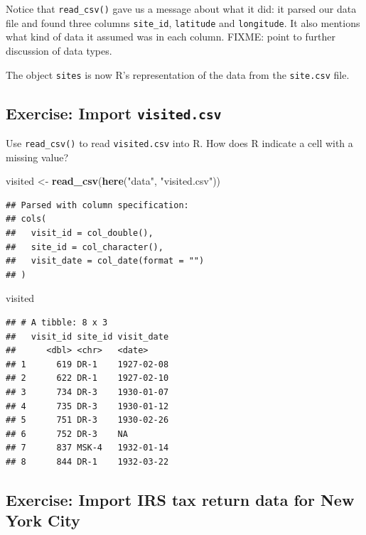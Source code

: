 \documentclass[]{Nemilov}
\newenvironment{Shaded}{\begin{snugshade}}{\end{snugshade}}
\newcommand{\KeywordTok}[1]{\textcolor[rgb]{0.13,0.29,0.53}{\textbf{#1}}}
\newcommand{\NormalTok}[1]{#1}
\newcommand{\StringTok}[1]{\textcolor[rgb]{0.31,0.60,0.02}{#1}}
\begin{document}
Notice that \texttt{read\_csv()} gave us a message about what it did: it parsed our data file and found three columns \texttt{site\_id}, \texttt{latitude} and \texttt{longitude}. It also mentions what kind of data it assumed was in each column. FIXME: point to further discussion of data types.

The object \texttt{sites} is now R's representation of the data from the \texttt{site.csv} file.

\hypertarget{exercise-import-visited.csv}{%
\subsection{\texorpdfstring{Exercise: Import \texttt{visited.csv}}{Exercise: Import visited.csv}}\label{exercise-import-visited.csv}}

Use \texttt{read\_csv()} to read \texttt{visited.csv} into R. How does R indicate a cell with a missing value?

\begin{Shaded}
\begin{Highlighting}[]
\NormalTok{visited <-}\StringTok{ }\KeywordTok{read_csv}\NormalTok{(}\KeywordTok{here}\NormalTok{(}\StringTok{"data"}\NormalTok{, }\StringTok{"visited.csv"}\NormalTok{))}
\end{Highlighting}
\end{Shaded}

\begin{verbatim}
## Parsed with column specification:
## cols(
##   visit_id = col_double(),
##   site_id = col_character(),
##   visit_date = col_date(format = "")
## )
\end{verbatim}

\begin{Shaded}
\begin{Highlighting}[]
\NormalTok{visited}
\end{Highlighting}
\end{Shaded}

\begin{verbatim}
## # A tibble: 8 x 3
##   visit_id site_id visit_date
##      <dbl> <chr>   <date>    
## 1      619 DR-1    1927-02-08
## 2      622 DR-1    1927-02-10
## 3      734 DR-3    1930-01-07
## 4      735 DR-3    1930-01-12
## 5      751 DR-3    1930-02-26
## 6      752 DR-3    NA        
## 7      837 MSK-4   1932-01-14
## 8      844 DR-1    1932-03-22
\end{verbatim}

\hypertarget{exercise-import-irs-tax-return-data-for-new-york-city}{%
\subsection{Exercise: Import IRS tax return data for New York City}\label{exercise-import-irs-tax-return-data-for-new-york-city}}
\end{document}
